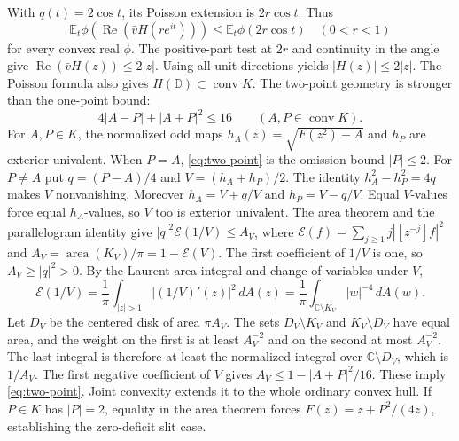 \documentclass[11pt]{article}
\newcommand{\D}{\mathbb D}
\newcommand{\C}{\mathbb C}
\newcommand{\E}{\mathbb E}
\begin{document}
	With $q(t)=2\cos t$, its Poisson extension is $2r\cos t$. Thus
	\begin{equation}\label{eq:ordinary-convex}
		\E_t\phi(\operatorname{Re}(\bar v H(re^{it})))
		\leq\E_t\phi(2r\cos t)\quad(0<r<1)
	\end{equation}
	for every convex real $\phi$. The positive-part test at $2r$ and
	continuity in the angle give $\operatorname{Re}(\bar vH(z))\leq2|z|$.
	Using all unit directions yields $|H(z)|\leq2|z|$. The Poisson
	formula also gives $H(\D)\subset\operatorname{conv}K$.
	The two-point geometry is stronger than the one-point bound:
	\begin{equation}\label{eq:two-point}
		4|A-P|+|A+P|^2\leq16
		\qquad(A,P\in\operatorname{conv}K).
	\end{equation}
	For $A,P\in K$, the normalized odd maps
	$h_A(z)=\sqrt{F(z^2)-A}$ and $h_P$ are exterior univalent.
	When $P=A$, \eqref{eq:two-point} is the omission bound $|P|\leq2$.
	For $P\ne A$ put $q=(P-A)/4$ and $V=(h_A+h_P)/2$.
	The identity $h_A^2-h_P^2=4q$ makes $V$ nonvanishing. Moreover
	$h_A=V+q/V$ and $h_P=V-q/V$. Equal $V$-values force equal
	$h_A$-values, so $V$ too is exterior univalent. The area theorem and the
	parallelogram identity give
	$|q|^2\mathcal E(1/V)\leq A_V$, where
	$\mathcal E(f)=\sum_{j\geq1}j|[z^{-j}]f|^2$ and
	$A_V=\operatorname{area}(K_V)/\pi=1-\mathcal E(V)$.
	The first coefficient of $1/V$ is one, so $A_V\geq |q|^2>0$.
	By the Laurent area integral and change of variables under $V$,
	\[
	\mathcal E(1/V)=\frac1\pi\int_{|z|>1}|(1/V)'(z)|^2\,dA(z)
	=\frac1\pi\int_{\C\setminus K_V}|w|^{-4}\,dA(w).
	\]
	Let $D_V$ be the centered disk of area $\pi A_V$. The sets
	$D_V\setminus K_V$ and $K_V\setminus D_V$ have equal area, and the
	weight on the first is at least $A_V^{-2}$ and on the second at most
	$A_V^{-2}$. The last integral is therefore at least the normalized
	integral over $\C\setminus D_V$, which is $1/A_V$.
	The first negative coefficient of $V$ gives
	$A_V\leq1-|A+P|^2/16$.  These imply \eqref{eq:two-point}.
	Joint convexity extends it to the whole ordinary convex hull.
	If $P\in K$ has $|P|=2$, equality in the area theorem forces
	$F(z)=z+P^2/(4z)$, establishing the zero-deficit slit case.
	
\end{document}
